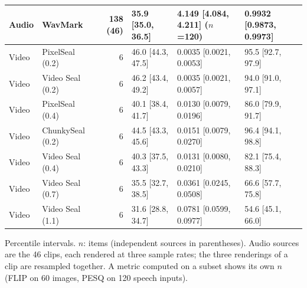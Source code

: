 \begin{table}[!t]
\begin{tabular}{llrlll}
Audio & WavMark & 138 (46) & 35.9 [35.0, 36.5] & 4.149 [4.084, 4.211] \tiny($n$=120) & 0.9932 [0.9873, 0.9973] \\
\midrule
Video & PixelSeal (0.2) & 6 & 46.0 [44.3, 47.5] & 0.0035 [0.0021, 0.0053] & 95.5 [92.7, 97.9] \\
Video & Video Seal (0.2) & 6 & 46.2 [43.4, 49.2] & 0.0035 [0.0021, 0.0057] & 94.0 [91.0, 97.1] \\
Video & PixelSeal (0.4) & 6 & 40.1 [38.4, 41.7] & 0.0130 [0.0079, 0.0196] & 86.0 [79.9, 91.7] \\
Video & ChunkySeal (0.2) & 6 & 44.5 [43.3, 45.6] & 0.0151 [0.0079, 0.0270] & 96.4 [94.1, 98.8] \\
Video & Video Seal (0.4) & 6 & 40.3 [37.5, 43.3] & 0.0131 [0.0080, 0.0210] & 82.1 [75.4, 88.3] \\
Video & Video Seal (0.7) & 6 & 35.5 [32.7, 38.5] & 0.0361 [0.0245, 0.0508] & 66.6 [57.7, 75.8] \\
Video & Video Seal (1.1) & 6 & 31.6 [28.8, 34.7] & 0.0781 [0.0599, 0.0977] & 54.6 [45.1, 66.0] \\
\bottomrule
\end{tabular}
\par\vspace{2pt}\parbox{\linewidth}{\raggedright\scriptsize Percentile intervals. $n$: items (independent sources in parentheses). Audio sources are the 46 clips, each rendered at three sample rates; the three renderings of a clip are resampled together. A metric computed on a subset shows its own $n$ (FLIP on 60 images, PESQ on 120 speech inputs).}
\end{table}
